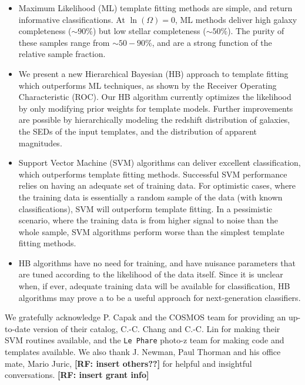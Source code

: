 \documentclass[12pt,preprint]{aastex}
\newcommand\rf[1]{{\bf [RF: #1]}}
\begin{document}
\begin{itemize}

\item Maximum Likelihood (ML) template fitting methods are simple, and
  return informative classifications.  At $\ln(\Omega)=0$, ML methods
  deliver high galaxy completeness ($\sim90\%$) but low stellar
  completeness ($\sim50\%$).  The purity of these samples range from
  $\sim50-90\%$, and are a strong function of the relative sample
  fraction.

\item We present a new Hierarchical Bayesian (HB) approach to template
  fitting which outperforms ML techniques, as shown by the Receiver
  Operating Characteristic (ROC).  Our HB algorithm currently
  optimizes the likelihood by only modifying prior weights for
  template models.  Further improvements are possible by
  hierarchically modeling the redshift distribution of galaxies, the
  SEDs of the input templates, and the distribution of apparent
  magnitudes.

\item Support Vector Machine (SVM) algorithms can deliver excellent
  classification, which outperforms template fitting methods.
  Successful SVM performance relies on having an adequate set of
  training data.  For optimistic cases, where the training data is
  essentially a random sample of the data (with known
  classifications), SVM will outperform template fitting.  In a
  pessimistic scenario, where the training data is from higher signal
  to noise than the whole sample, SVM algorithms perform worse than
  the simplest template fitting methods.

\item HB algorithms have no need for training, and have nuisance
  parameters that are tuned according to the likelihood of the data
  itself.  Since it is unclear when, if ever, adequate training data
  will be available for classification, HB algorithms may prove a to
  be a useful approach for next-generation classifiers.

\end{itemize}

\acknowledgments

We gratefully acknowledge P. Capak and the COSMOS team for providing
an up-to-date version of their catalog, C.-C. Chang and C.-C. Lin
for making their SVM routines available, and the {\tt Le Phare}
photo-z team for making code and templates available.  We also thank
J. Newman, Paul Thorman and his office mate, Mario Juric, \rf{insert others??} for helpful and insightful
conversations.  \rf{insert grant info}
\end{document}
